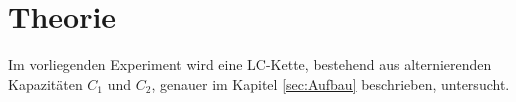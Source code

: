 \section{Theorie}
Im vorliegenden Experiment wird eine LC-Kette, bestehend aus alternierenden Kapazitäten $C_1$ und $C_2$, genauer im Kapitel \ref{sec:Aufbau} beschrieben, untersucht.

